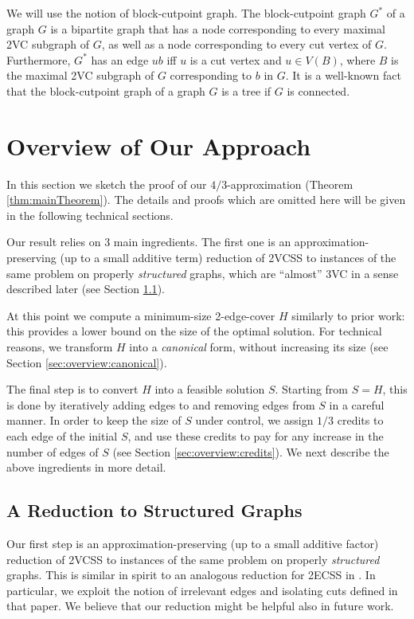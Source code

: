 \documentclass{theoretics}
\begin{document}
We will use the notion of block-cutpoint graph. The block-cutpoint graph $G^*$ of a graph $G$ is a bipartite graph that has a node corresponding to every maximal 2VC subgraph of $G$, as well as a node corresponding to every cut vertex of $G$. Furthermore, $G^*$ has an edge $ub$ iff $u$ is a cut vertex and $u\in V(B)$, where $B$ is the maximal 2VC subgraph of $G$ corresponding to $b$ in $G$. It is a well-known fact~\cite[Chapter~3]{west2001introduction} that the block-cutpoint graph of a graph $G$ is a tree if $G$ is connected.

\section{Overview of Our Approach}
\label{sec:overview}

In this section we sketch the proof of our $4/3$-approximation (Theorem \ref{thm:mainTheorem}). The details and proofs which are omitted here will be given in the following technical sections. 

Our result relies on $3$ main ingredients. The first one is an approximation-preserving (up to a small additive term) reduction of 2VCSS to instances of the same problem on properly \emph{structured} graphs, which are ``almost'' 3VC in a sense described later (see Section \ref{sec:overview:structured}).

At this point we compute a minimum-size 2-edge-cover $H$ similarly to prior work: this provides a lower bound on the size of the optimal solution. For technical reasons, we transform $H$ into a \emph{canonical} form,  without increasing its size (see Section \ref{sec:overview:canonical}).

The final step is to convert $H$ into a feasible solution $S$. Starting from $S=H$, this is done by iteratively adding edges to and removing edges from $S$ in a careful manner. In order to keep the size of $S$ under control, we assign $1/3$ credits to each edge of the initial $S$, and use these credits to pay for any increase in the number of edges of $S$ (see Section \ref{sec:overview:credits}). We next describe the above ingredients in more detail.

\subsection{A Reduction to Structured Graphs}
\label{sec:overview:structured}

Our first step is an approximation-preserving (up to a small additive factor) reduction of 2VCSS to instances of the same problem on properly \emph{structured} graphs. This is similar in spirit to an analogous reduction for 2ECSS in \cite{GGJ23}. In particular, we exploit the notion of irrelevant edges and isolating cuts defined in that paper. We believe that our reduction might be helpful also in future work.
\end{document}
